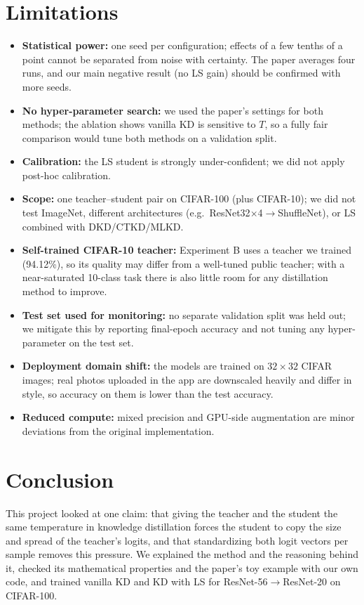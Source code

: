 \documentclass[12pt,a4paper]{article}
\begin{document}
\section{Limitations}
\begin{itemize}[nosep]
\item \textbf{Statistical power:} one seed per configuration; effects of a few tenths of a point cannot be separated from noise with certainty. The paper averages four runs, and our main negative result (no LS gain) should be confirmed with more seeds.
\item \textbf{No hyper-parameter search:} we used the paper's settings for both methods; the ablation shows vanilla KD is sensitive to $T$, so a fully fair comparison would tune both methods on a validation split.
\item \textbf{Calibration:} the LS student is strongly under-confident; we did not apply post-hoc calibration.
\item \textbf{Scope:} one teacher--student pair on CIFAR-100 (plus CIFAR-10); we did not test ImageNet, different architectures (e.g.\ ResNet32$\times$4$\rightarrow$ShuffleNet), or LS combined with DKD/CTKD/MLKD.
\item \textbf{Self-trained CIFAR-10 teacher:} Experiment B uses a teacher we trained (94.12\%), so its quality may differ from a well-tuned public teacher; with a near-saturated 10-class task there is also little room for any distillation method to improve.
\item \textbf{Test set used for monitoring:} no separate validation split was held out; we mitigate this by reporting final-epoch accuracy and not tuning any hyper-parameter on the test set.
\item \textbf{Deployment domain shift:} the models are trained on $32\times32$ CIFAR images; real photos uploaded in the app are downscaled heavily and differ in style, so accuracy on them is lower than the test accuracy.
\item \textbf{Reduced compute:} mixed precision and GPU-side augmentation are minor deviations from the original implementation.
\end{itemize}

\section{Conclusion}
This project looked at one claim: that giving the teacher and the student the same temperature in knowledge distillation forces the student to copy the size and spread of the teacher's logits, and that standardizing both logit vectors per sample removes this pressure. We explained the method and the reasoning behind it, checked its mathematical properties and the paper's toy example with our own code, and trained vanilla KD and KD with LS for ResNet-56$\rightarrow$ResNet-20 on CIFAR-100.
\end{document}
